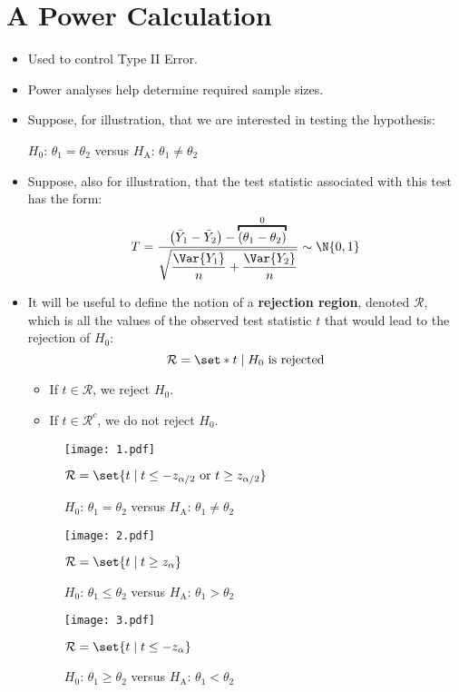 \section{A Power Calculation}
\begin{itemize}
      \item Used to control Type II Error.
      \item Power analyses help determine required sample sizes.
      \item Suppose, for illustration, that we are interested in testing the hypothesis:

            \centerline{$ H_0 $: $ \theta_1=\theta_2 $ versus $ H_\text{A} $: $ \theta_1\ne \theta_2 $}
      \item Suppose, also for illustration, that the test statistic associated with this test has
            the form:
            \[ T=\frac{\bigl(\bar{Y}_1-\bar{Y}_2\bigr)-\overbracket{(\theta_1-\theta_2)}^0}{\displaystyle \sqrt{\frac{\Var{Y_1}}{n}+\frac{\Var{Y_2}}{n} }}\sim \N{0,1}  \]
      \item It will be useful to define the notion of a \textbf{rejection region}, denoted $ \mathcal{R} $,
            which is all the values of the observed test statistic $ t $ that would lead to the rejection
            of $ H_0 $:
            \[ \mathcal{R}=\set*{t\mid H_0\text{ is rejected}} \]
            \begin{itemize}
                  \item If $ t\in\mathcal{R} $, we reject $ H_0 $.
                  \item If $ t\in\mathcal{R}^c $, we do not reject $ H_0 $.
            \end{itemize}
            \begin{figure}[!htbp]
                  \centering
                  \texttt{[image: 1.pdf]}
                  \caption{$ H_0 $: $ \theta_1=\theta_2 $ versus $ H_\text{A} $: $ \theta_1\ne \theta_2 $}{$ \mathcal{R}=\set{t\mid t\le -z_{\alpha/2}\text{ or }t\ge z_{\alpha/2}} $}
            \end{figure}
            \begin{figure}[!htbp]
                  \centering
                  \texttt{[image: 2.pdf]}
                  \caption{$ H_0 $: $ \theta_1\le\theta_2 $ versus $ H_\text{A} $: $ \theta_1>\theta_2 $}{$ \mathcal{R}=\set{t\mid t\ge z_{\alpha}} $}
            \end{figure}
            \begin{figure}[!htbp]
                  \centering
                  \texttt{[image: 3.pdf]}
                  \caption{$ H_0 $: $ \theta_1\ge\theta_2 $ versus $ H_\text{A} $: $ \theta_1<\theta_2 $}{$ \mathcal{R}=\set{t\mid t\le -z_{\alpha}} $}
            \end{figure}
\end{itemize}
